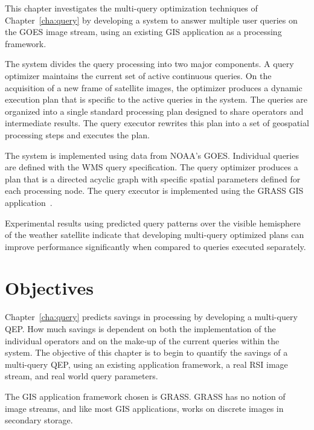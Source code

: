 \documentclass{ucdthesis}       %
\begin{document}
This chapter investigates the multi-query optimization techniques of
Chapter~\ref{cha:query} by developing a system to answer multiple user
queries on the \acf{GOES} image stream, using an existing \ac{GIS}
application as a processing framework.  

The system divides the query processing into two major components.  A
query optimizer maintains the current set of active continuous
queries. On the acquisition of a new frame of satellite images, the
optimizer produces a dynamic execution plan that is specific to the
active queries in the system. The queries are organized into a single
standard processing plan designed to share operators and intermediate
results.  The query executor rewrites this plan into a set of
geospatial processing steps and executes the plan.

The system is implemented using data from \acs{NOAA}'s \ac{GOES}.
Individual queries are defined with the \ac{WMS} query
specification. The query optimizer produces a plan that is a directed
acyclic graph with specific spatial parameters defined for each
processing node.  The query executor is implemented using the
\acf{GRASS} \ac{GIS} application~\cite{GRASS_GIS_software}.

Experimental results using predicted query patterns over the visible
hemisphere of the weather satellite indicate that developing
multi-query optimized plans can improve performance significantly when
compared to queries executed separately.


\section{Objectives}
\label{sec:ex-problem}

Chapter~\ref{cha:query} predicts savings in processing by developing a
multi-query \ac{QEP}.  How much savings is dependent on both the
implementation of the individual operators and on the make-up of the
current queries within the system.  The objective of this chapter is
to begin to quantify the savings of a multi-query \ac{QEP}, using
an existing application framework, a real \ac{RSI} image
stream, and real world query parameters.

The \ac{GIS} application framework chosen is \ac{GRASS}.
\ac{GRASS} has no notion of image streams, and like most \ac{GIS}
applications, works on discrete images in secondary storage.
\end{document}
